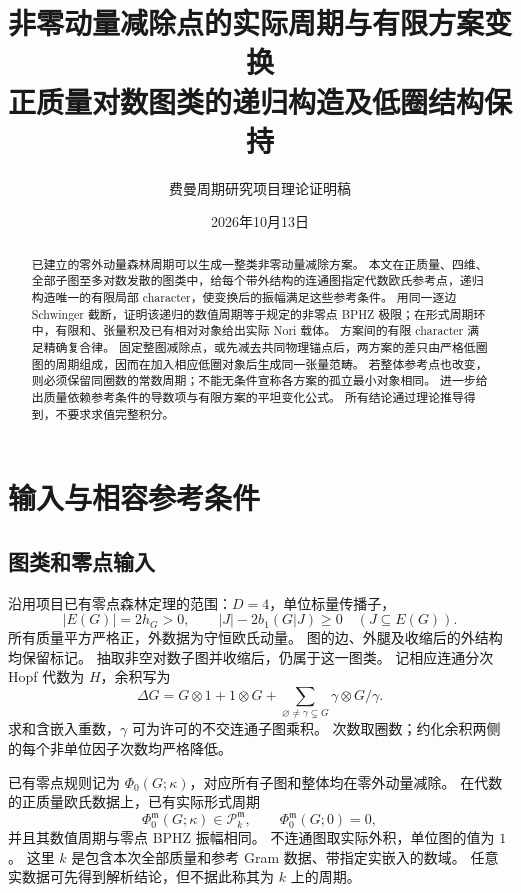 \documentclass[11pt,a4paper]{ctexart}
\title{非零动量减除点的实际周期与有限方案变换\\[5pt]
\large 正质量对数图类的递归构造及低圈结构保持}
\author{费曼周期研究项目\quad 理论证明稿}
\date{2026年10月13日}
\theoremstyle{cnplain}
\theoremstyle{remark}\newtheorem{remark}[theorem]{注}
\newcommand{\cP}{\mathcal P}
\begin{document}
\maketitle
\begin{abstract}
已建立的零外动量森林周期可以生成一整类非零动量减除方案。
本文在正质量、四维、全部子图至多对数发散的图类中，给每个带外结构的连通图指定代数欧氏参考点，递归构造唯一的有限局部 character，使变换后的振幅满足这些参考条件。
用同一逐边 Schwinger 截断，证明该递归的数值周期等于规定的非零点 BPHZ 极限；在形式周期环中，有限和、张量积及已有相对对象给出实际 Nori 载体。
方案间的有限 character 满足精确复合律。
固定整图减除点，或先减去共同物理锚点后，两方案的差只由严格低圈图的周期组成，因而在加入相应低圈对象后生成同一张量范畴。
若整体参考点也改变，则必须保留同圈数的常数周期；不能无条件宣称各方案的孤立最小对象相同。
进一步给出质量依赖参考条件的导数项与有限方案的平坦变化公式。
所有结论通过理论推导得到，不要求求值完整积分。
\end{abstract}

\section{输入与相容参考条件}
\subsection{图类和零点输入}
沿用项目已有零点森林定理的范围：$D=4$，单位标量传播子，
\begin{equation}\label{eq:class}
 |E(G)|=2h_G>0,\qquad |J|-2b_1(G|J)\geq0\quad(J\subseteq E(G)).
\end{equation}
所有质量平方严格正，外数据为守恒欧氏动量。
图的边、外腿及收缩后的外结构均保留标记。
抽取非空对数子图并收缩后，仍属于这一图类。
记相应连通分次 Hopf 代数为 $H$，余积写为
\begin{equation}\label{eq:coproduct}
 \Delta G=G\otimes1+1\otimes G+
       \sum_{\varnothing\ne\gamma\subsetneq G}\gamma\otimes G/\gamma.
\end{equation}
求和含嵌入重数，$\gamma$ 可为许可的不交连通子图乘积。
次数取圈数；约化余积两侧的每个非单位因子次数均严格降低。

已有零点规则记为 $\Phi_0(G;\kappa)$，对应所有子图和整体均在零外动量减除。
在代数的正质量欧氏数据上，已有实际形式周期
\begin{equation}\label{eq:zero}
 \Phi_0^{\mathfrak m}(G;\kappa)\in\cP_k^{\mathfrak m},
 \qquad \Phi_0^{\mathfrak m}(G;0)=0,
\end{equation}
并且其数值周期与零点 BPHZ 振幅相同。
不连通图取实际外积，单位图的值为 $1$。
这里 $k$ 是包含本次全部质量和参考 Gram 数据、带指定实嵌入的数域。
任意实数据可先得到解析结论，但不据此称其为 $k$ 上的周期。
\end{document}
